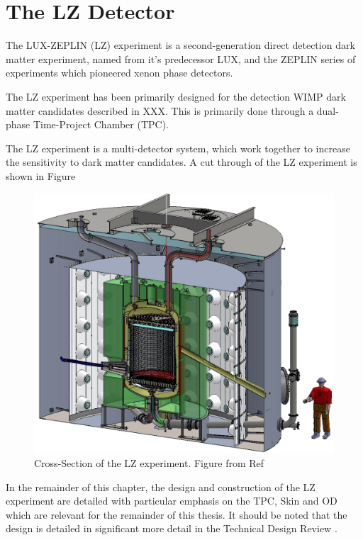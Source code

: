 \section{The LZ Detector}
\par
The LUX-ZEPLIN (LZ) experiment is a second-generation direct detection dark matter experiment, named from it's predecessor LUX, and the ZEPLIN series of experiments which pioneered xenon phase detectors.

The LZ experiment has been primarily designed for the detection WIMP dark matter candidates described in XXX. 
This is primarily done through a dual-phase Time-Project Chamber (TPC).

\par
The LZ experiment is a multi-detector system, which work together to increase the sensitivity to dark matter candidates.
A cut through of the LZ experiment is shown in Figure 

\begin{figure}
    \centering
    \includegraphics[width=\textwidth]{Figures/LZ/LZ_Cut_CAD.jpg}
    \caption{Cross-Section of the LZ experiment. Figure from Ref \cite{LZ_TechnicalDesignReview_ref}}
    \label{fig:LZ_Cut_CAD}
\end{figure}



\par
In the remainder of this chapter, the design and construction of the LZ experiment are detailed with particular emphasis on the TPC, Skin and OD which are relevant for the remainder of this thesis. 
It should be noted that the design is detailed in significant more detail in the Technical Design Review \cite{LZ_TechnicalDesignReview_ref}.


